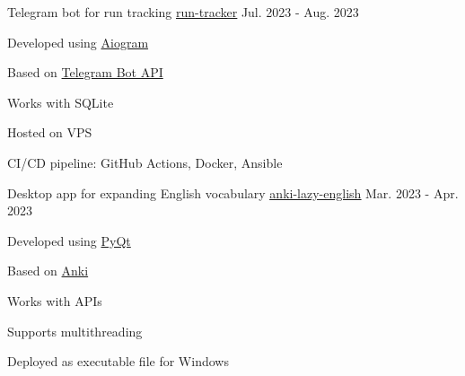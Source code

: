 
\begin{cventries}

  \cventry
  {Telegram bot for run tracking}
  {\href{https://github.com/ilev-sergey/run-tracker}{\underline{run-tracker}}}
  {}
  {Jul. 2023 - Aug. 2023}
  {
    \begin{cvitems}
      \item {Developed using \href{https://docs.aiogram.dev}{Aiogram}}
      \item {Based on \href{https://core.telegram.org/bots/api}{Telegram Bot API}}
      \item {Works with SQLite}
      \item {Hosted on VPS}
      \item {CI/CD pipeline: GitHub Actions, Docker, Ansible}
    \end{cvitems}
  }

  \cventry
  {Desktop app for expanding English vocabulary}
  {\href{https://github.com/ilev-sergey/anki-lazy-english}{\underline{anki-lazy-english}}}
  {}
  {Mar. 2023 - Apr. 2023}
  {
    \begin{cvitems}
      \item {Developed using \href{https://en.wikipedia.org/wiki/PyQt}{PyQt}}
      \item {Based on \href{https://en.wikipedia.org/wiki/Anki_(software)}{Anki}}
      \item {Works with APIs}
      \item {Supports multithreading}
      \item {Deployed as executable file for Windows}
    \end{cvitems}
  }

\end{cventries}
